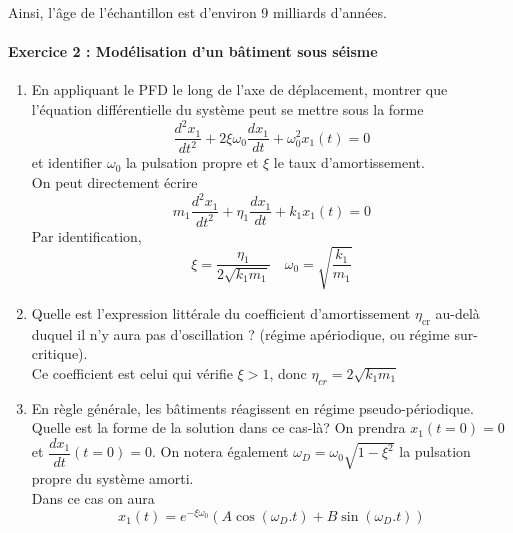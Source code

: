 \documentclass[a4paper,10pt,notitlepage,oneside]{article}
\theoremstyle{plain}
\begin{document}
\begin{enumerate}
    Ainsi, l’âge de l’échantillon est d’environ 9 milliards d’années.
\end{enumerate}



\paragraph{\color{BlueViolet} Exercice 2 : Modélisation d'un bâtiment sous séisme}

\begin{enumerate}
    \item En appliquant le PFD le long de l'axe de déplacement, montrer que l'équation différentielle du système peut se mettre sous la forme
    \begin{equation*}
        \dfrac{d^2x_1}{dt^2}+2\xi\omega_0\dfrac{dx_1}{dt}+\omega_0^2x_1(t) = 0
    \end{equation*}
    et identifier $\omega_0$ la pulsation propre et $\xi$ le taux d'amortissement.\\
    
    On peut directement écrire 
    \begin{equation*}
        m_1\dfrac{d^2x_1}{dt^2}+\eta_1\dfrac{dx_1}{dt}+k_1x_1(t) = 0
    \end{equation*}
    Par identification,
    \begin{equation*}
        \boxed{\xi = \dfrac{\eta_1}{2\sqrt{k_1m_1}}}\quad 
        \boxed{\omega_0 = \sqrt{\dfrac{k_1}{m_1}}}
    \end{equation*}
    
    \item Quelle est l'expression littérale du coefficient d'amortissement $\eta_{\text{cr}}$ au-delà duquel il n'y aura pas d'oscillation ? (régime apériodique, ou régime sur-critique).\\

    Ce coefficient est celui qui vérifie $\xi>1$, donc $\boxed{\eta_{cr}=2\sqrt{k_1m_1}}$
    
    \item En règle générale, les bâtiments réagissent en régime pseudo-périodique. Quelle est la forme de la solution dans ce cas-là? On prendra $x_1(t=0)=0$ et $\dfrac{dx_1}{dt}(t=0) = 0$. On notera également $\omega_D = \omega_0\sqrt{1-\xi^2}$ la pulsation propre du système amorti.\\
    
    Dans ce cas on aura
    \begin{equation*}
        \boxed{x_1(t) = e^{-\xi\omega_0}\left(A\cos\left(\omega_D.t\right)+B\sin\left(\omega_D.t\right)\right)}
    \end{equation*}
    

\end{enumerate}
\end{document}
